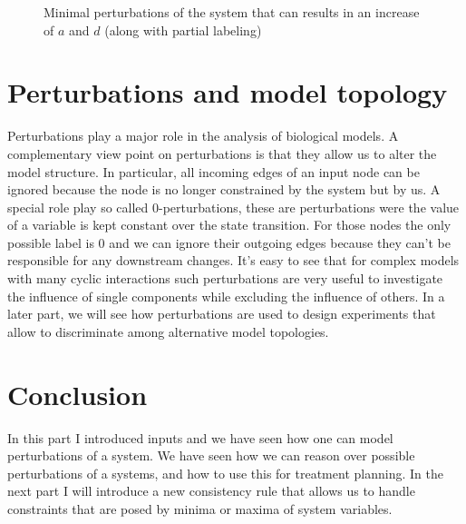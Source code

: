 \begin{figure}
\begin{center}
  
\end{center}
\caption{Minimal perturbations of the system that can results in an increase of $a$ and $d$ (along with partial labeling)}
\label{fig:ig_labeled3}
\end{figure}

\section*{Perturbations and model topology}

Perturbations play a major role in the analysis of biological models.
A complementary view point on perturbations is that they allow us to alter the model structure.
In particular, all incoming edges of an input node can be ignored because the node is no longer constrained by the system but by us.
A special role play so called 0-perturbations, 
 these are perturbations were the value of a variable is kept constant over the state transition.
For those nodes the only possible label is 0 and we can ignore their outgoing edges because they can't be responsible for any downstream changes.
It's easy to see that for complex models with many cyclic interactions such perturbations are very useful
 to investigate the influence of single components while excluding the influence of others.
In a later part, we will see how perturbations are used to design experiments that allow to discriminate among alternative model topologies.

\section*{Conclusion}

In this part I introduced inputs and we have seen how one can model perturbations of a system.
We have seen how we can reason over possible perturbations of a systems, and how to use this for treatment planning.
In the next part I will introduce a new consistency rule that allows us to handle constraints that are posed by minima or maxima of system variables.
